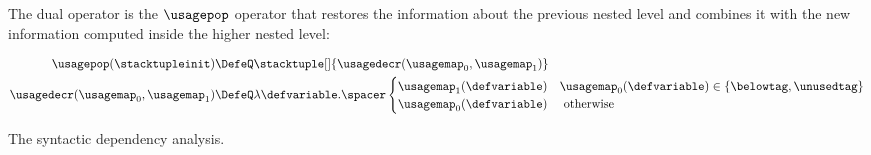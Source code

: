 The dual operator is the $\usagepop$ operator that restores the information about the previous nested level and combines it with the new information computed inside the higher nested level:

\begin{align*}
  \usagepop(\stacktupleinit) &\DefeQ \stacktuple[]{\usagedecr(\usagemap_0, \usagemap_1)} \\
  \usagedecr(\usagemap_0, \usagemap_1) &\DefeQ \lambda \defvariable.\spacer \begin{cases}
    \usagemap_1(\defvariable) & \usagemap_0(\defvariable) \in \{ \belowtag, \unusedtag \} \\
    \usagemap_0(\defvariable) & \text{ otherwise}
  \end{cases}
\end{align*}

\begin{marginfigure}[*-5]
\caption{The syntactic dependency analysis.}
\end{marginfigure}

